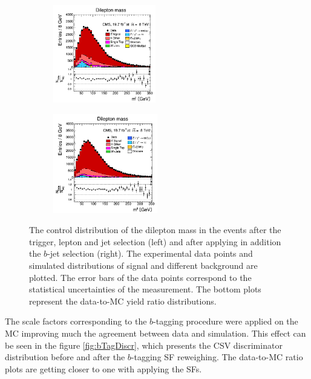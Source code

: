 \begin{itemize}
 \begin{figure}[h]
 \centering
 \begin{subfigure}
   \centering
   \includegraphics[width=0.49\textwidth]{04_event_reconstruction/plots/mll_step6.png}
 \end{subfigure}
 \begin{subfigure}
   \centering
   \includegraphics[width=0.50\textwidth]{04_event_reconstruction/plots/mll_step7.png}
 \end{subfigure}
 \caption{The control distribution of the dilepton mass in the events after the trigger, lepton and jet selection (left) and after applying in addition the $b$-jet selection (right). 
 The experimental data points and simulated distributions of signal and different background are plotted. The error bars of the data points
 correspond to the statistical uncertainties of the measurement. The bottom plots represent the data-to-MC yield ratio distributions.}
 \label{fig:mllbJetSel}
 \end{figure}
 
 The scale factors corresponding to the $b$-tagging procedure were applied on the MC improving much the agreement between data and simulation. This effect can be seen in the 
 figure \ref{fig:bTagDiscr}, which presents the CSV discriminator distribution before and after the $b$-tagging SF reweighing. The data-to-MC ratio plots are getting closer to one with
 applying the SFs.
 

\end{itemize}
